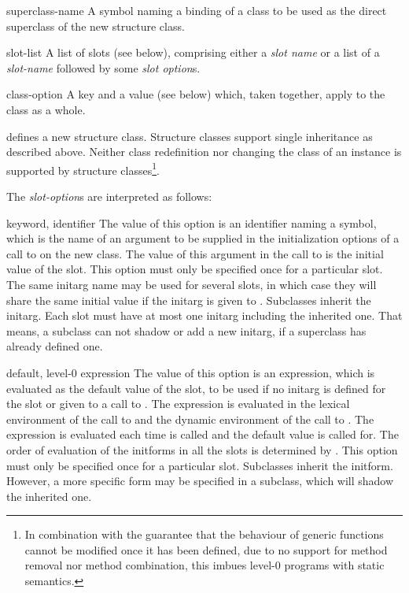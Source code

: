 \begin{optDefinition}
\begin{arguments}
    \item[superclass-name] A symbol naming a binding of a class to be used as
    the direct superclass of the new structure class.

    \item[slot-list] A list of slots (see below), comprising either a {\em slot
        name} or a list of a {\em slot-name} followed by some {\em slot
        option}s.

    \item[class-option] A key and a value (see below) which, taken together,
    apply to the class as a whole.
\end{arguments}
%
\remarks%
 defines a new structure class. Structure classes support
single inheritance as described above. Neither class redefinition nor changing
the class of an instance is supported by structure classes\footnote{In
    combination with the guarantee that the behaviour of generic functions
    cannot be modified once it has been defined, due to no support for method
    removal nor method combination, this imbues level-0 programs with static
    semantics.}.

The {\em slot-option\/}s are interpreted as follows:
\begin{options}
    \item[keyword, identifier]%
    The value of this option is an identifier naming a symbol, which is the name
    of an argument to be supplied in the initialization options of a call to
     on the new class.  The value of this argument in the call
    to  is the initial value of the slot.  This option must
    only be specified once for a particular slot.  The same initarg name may be
    used for several slots, in which case they will share the same initial value
    if the initarg is given to .  Subclasses inherit the
    initarg. Each slot must have at most one initarg including the inherited
    one. That means, a subclass can not shadow or add a new initarg, if a
    superclass has already defined one.

    \item[default, level-0 expression]%
    The value of this option is an expression, which is evaluated as the default
    value of the slot, to be used if no initarg is defined for the slot or given
    to a call to .  The expression is evaluated in the lexical
    environment of the call to  and the dynamic environment
    of the call to .  The expression is evaluated each time
     is called and the default value is called for.  The order
    of evaluation of the initforms in all the slots is determined by
    .  This option must only be specified once for a
    particular slot. Subclasses inherit the initform.  However, a more specific
    form may be specified in a subclass, which will shadow the inherited one.


\end{options}
\end{optDefinition}
